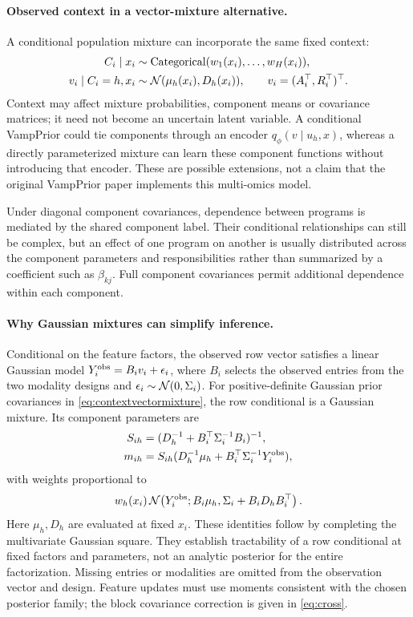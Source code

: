 \paragraph{Observed context in a vector-mixture alternative.}
A conditional population mixture can incorporate the same fixed context:
\begin{align}
C_i\mid x_i&\sim\operatorname{Categorical}(w_1(x_i),\ldots,w_H(x_i)),\\
v_i\mid C_i=h,x_i&\sim\mathcal N(\mu_h(x_i),D_h(x_i)),
\qquad v_i=(A_i^\top,R_i^\top)^\top .
\label{eq:contextvectormixture}
\end{align}
Context may affect mixture probabilities, component means or covariance
matrices; it need not become an uncertain latent variable.
A conditional VampPrior could tie components through an encoder
\(q_\phi(v\mid u_h,x)\), whereas a directly parameterized mixture can
learn these component functions without introducing that encoder.
These are possible extensions, not a claim that the original VampPrior
paper implements this multi-omics model.

Under diagonal component covariances, dependence between programs is
mediated by the shared component label. Their conditional relationships
can still be complex, but an effect of one program on another is usually
distributed across the component parameters and responsibilities rather
than summarized by a coefficient such as \(\beta_{kj}\).
Full component covariances permit additional dependence within each
component.

\paragraph{Why Gaussian mixtures can simplify inference.}
Conditional on the feature factors, the observed row vector satisfies
a linear Gaussian model \(Y_i^{\rm obs}=B_i v_i+\epsilon_i\), where
\(B_i\) selects the observed entries from the two modality designs and
\(\epsilon_i\sim\mathcal N(0,\Sigma_i)\).
For positive-definite Gaussian prior covariances in
\eqref{eq:contextvectormixture}, the row conditional is a Gaussian mixture.
Its component parameters are
\begin{align}
S_{ih}&=(D_h^{-1}+B_i^\top\Sigma_i^{-1}B_i)^{-1},\\
m_{ih}&=S_{ih}(D_h^{-1}\mu_h+B_i^\top\Sigma_i^{-1}Y_i^{\rm obs}),
\end{align}
with weights proportional to
\[
w_h(x_i)\,
\mathcal N\!\left(Y_i^{\rm obs};B_i\mu_h,
               \Sigma_i+B_iD_hB_i^\top\right).
\]
Here \(\mu_h,D_h\) are evaluated at fixed \(x_i\).
These identities follow by completing the multivariate Gaussian square.
They establish tractability of a row conditional at fixed factors and
parameters, not an analytic posterior for the entire factorization.
Missing entries or modalities are omitted from the observation vector
and design. Feature updates must use moments consistent with the chosen posterior
family; the block covariance correction is given in \eqref{eq:cross}.

